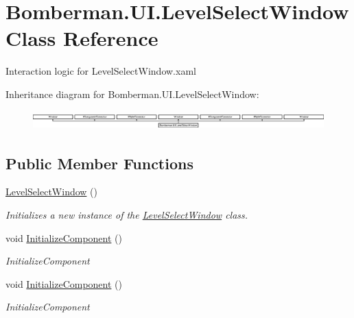 \hypertarget{class_bomberman_1_1_u_i_1_1_level_select_window}{}\section{Bomberman.\+U\+I.\+Level\+Select\+Window Class Reference}
\label{class_bomberman_1_1_u_i_1_1_level_select_window}


Interaction logic for Level\+Select\+Window.\+xaml  


Inheritance diagram for Bomberman.\+U\+I.\+Level\+Select\+Window\+:\begin{figure}[H]
\begin{center}
\leavevmode
\includegraphics[height=0.744186cm]{class_bomberman_1_1_u_i_1_1_level_select_window}
\end{center}
\end{figure}
\subsection*{Public Member Functions}
\begin{DoxyCompactItemize}
\item 
\mbox{\hyperlink{class_bomberman_1_1_u_i_1_1_level_select_window_a0e171b2f7d9c376c1b3b12b836b383f0}{Level\+Select\+Window}} ()
\begin{DoxyCompactList}\small\item\em Initializes a new instance of the \mbox{\hyperlink{class_bomberman_1_1_u_i_1_1_level_select_window}{Level\+Select\+Window}} class. \end{DoxyCompactList}\item 
void \mbox{\hyperlink{class_bomberman_1_1_u_i_1_1_level_select_window_acc52a3ab149bf783722514ed3d4b19cf}{Initialize\+Component}} ()
\begin{DoxyCompactList}\small\item\em Initialize\+Component \end{DoxyCompactList}\item 
void \mbox{\hyperlink{class_bomberman_1_1_u_i_1_1_level_select_window_acc52a3ab149bf783722514ed3d4b19cf}{Initialize\+Component}} ()
\begin{DoxyCompactList}\small\item\em Initialize\+Component \end{DoxyCompactList}\end{DoxyCompactItemize}
